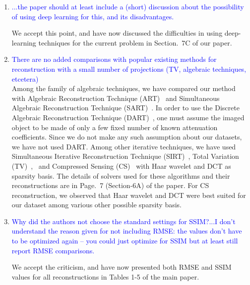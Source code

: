 \documentclass{article}
\begin{document}
 \begin{enumerate}
 \item    \textcolor{blue}{...the paper should at least include a (short) discussion about the
     possibility of using deep learning for this, and its disadvantages.}

   We accept this point, and have now discussed the difficulties in
   using deep-learning techniques for the current problem in Section.~7C
   of our paper. 

\item \textcolor{blue}{There are no added comparisons with popular existing methods for
  reconstruction with a small number of projections (TV, algebraic techniques, etcetera)}\\
  
 Among the family of algebraic techniques, we have compared our method
 with Algebraic Reconstruction Technique (ART)~\cite{art} and Simultaneous
 Algebraic Reconstruction Technique (SART)~\cite{sart}. In order to use the Discrete Algebraic Reconstruction Technique (DART)~\cite{dart}, one must assume the imaged object to be made of only a few fixed number of known attenuation coefficients. Since we do not make any such assumption about  our datasets, we have not used DART. %
 Among other iterative techniques, we
 have used Simultaneous Iterative Reconstruction Technique (SIRT)~\cite{sirt},
 Total Variation (TV)~\cite{TV},~\cite{TVReg} and Compressed Sensing (CS)~\cite{lasso} with Haar wavelet
 and DCT as sparsity basis. The details of solvers used for these
 algorithms and their reconstructions are in Page.~7 (Section-6A) of
 the paper. For CS reconstruction, we observed that Haar wavelet and
 DCT were best suited for our dataset among various other possible
 sparsity basis.

\item \textcolor{blue}{Why did the authors not choose the standard
  settings for SSIM?...I don’t understand the reason given for not
  including RMSE: the values don’t have to be optimized again -- you
  could just optimize for SSIM but at least still report RMSE
  comparisons.}

We accept the criticism, and have now presented both RMSE and SSIM
values for all reconstructions in Tables 1-5 of the main paper. 
  \begin{comment}
Since
RMSE corresponds to error in intensity values, we have used SSIM with
a higher weightage to structure for the purpose of measuring error in
preservation of structures in our reconstructions.


\end{comment}
\end{enumerate}
\end{document}
